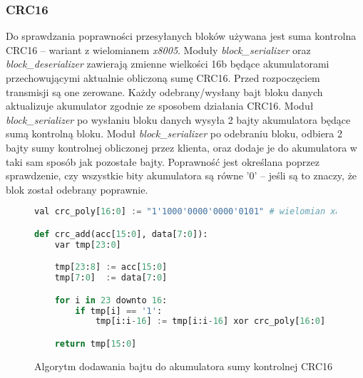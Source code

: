 \subsubsection{CRC16}
Do sprawdzania poprawności przesyłanych bloków używana jest suma kontrolna CRC16 -- wariant z wielomianem \textit{x8005}. Moduły \textit{block\_serializer} oraz \textit{block\_deserializer} zawierają zmienne wielkości 16b będące akumulatorami przechowującymi aktualnie obliczoną sumę CRC16. Przed rozpoczęciem transmisji są one zerowane. Każdy odebrany/wysłany bajt bloku danych aktualizuje akumulator zgodnie ze sposobem działania CRC16. Moduł \textit{block\_serializer} po wysłaniu bloku danych wysyła 2 bajty akumulatora będące sumą kontrolną bloku. Moduł \textit{block\_serializer} po odebraniu bloku, odbiera 2 bajty sumy kontrolnej obliczonej przez klienta, oraz dodaje je do akumulatora w taki sam sposób jak pozostałe bajty. Poprawność jest określana poprzez sprawdzenie, czy wszystkie bity akumulatora są równe {'0'} -- jeśli są to znaczy, że blok został odebrany poprawnie.

\begin{figure}[!h]
\begin{lstlisting}[language=Python, basicstyle=\ttfamily, autogobble=true, tabsize=3, morekeywords={downto, val, var}]
val crc_poly[16:0] := "1'1000'0000'0000'0101" # wielomian x8005

def crc_add(acc[15:0], data[7:0]):
	var tmp[23:0]

	tmp[23:8] := acc[15:0]
	tmp[7:0]  := data[7:0]

	for i in 23 downto 16:
		if tmp[i] == '1':
			tmp[i:i-16] := tmp[i:i-16] xor crc_poly[16:0]

	return tmp[15:0]
\end{lstlisting}
\caption{Algorytm dodawania bajtu do akumulatora sumy kontrolnej CRC16}
\end{figure}